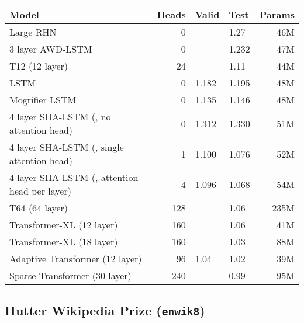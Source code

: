 \documentclass{article}
\newcommand{\enwik}{\texttt{enwik8}\xspace}
\begin{document}
\begin{table*}
\small
\begin{center}
 \begin{tabular}{@{} lrllr @{}}
 \toprule[1.5pt]
 Model & Heads & Valid & Test & Params \\
 \midrule
 Large RHN \cite{Zilly2016}& 0 &  & 1.27 & 46M \\
 3 layer AWD-LSTM \cite{merity2018analysis} & 0 &  & 1.232 & 47M \\
T12 (12 layer) \cite{al2019character} & 24 &  & 1.11 & 44M \\
 LSTM \cite{melis2019mogrifier} & 0 & 1.182 & 1.195 & 48M \\
 Mogrifier LSTM \cite{melis2019mogrifier} & 0 & 1.135 & 1.146 & 48M \\
 \midrule
 4 layer SHA-LSTM (, no attention head) & 0 & 1.312 & 1.330 & 51M \\
 4 layer SHA-LSTM (, single attention head) & 1 & 1.100 & 1.076 & 52M \\
 4 layer SHA-LSTM (, attention head per layer) & 4 & 1.096 & 1.068 & 54M \\
\midrule
 T64 (64 layer) \cite{al2019character} & 128 &  & 1.06 & 235M \\
 Transformer-XL (12 layer) \cite{dai2019transformer} & 160 &  & 1.06 & 41M \\
 Transformer-XL (18 layer) \cite{dai2019transformer} & 160 &  & 1.03 & 88M \\
 Adaptive Transformer (12 layer) \cite{sukhbaatar2019adaptive} & 96 & 1.04 & 1.02 & 39M \\
 Sparse Transformer (30 layer) \cite{child2019generating} & 240 &  & 0.99 & 95M \\
\bottomrule
\end{tabular}
\end{center}
\caption{
Bits Per Character (BPC) on \enwik.
The single attention SHA-LSTM has an attention head on the second last layer and had batch size 16 due to lower memory use.
Directly comparing the head count for LSTM models and Transformer models obviously doesn't make sense but neither does comparing zero-headed LSTMs against bajillion headed models and then declaring an entire species dead.
The hyper-parameters for the fully headed SHA-LSTM were used for the other SHA-LSTM experiments with zero tuning.
}
\label{table:enwik8}
\end{table*}

\subsection{Hutter Wikipedia Prize (\enwik)}
\end{document}
